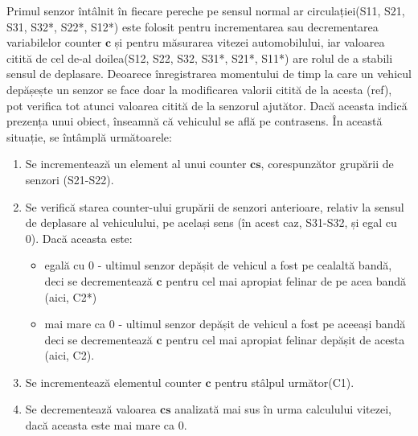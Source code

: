 Primul senzor întâlnit în fiecare pereche pe sensul normal ar circulației(S11, S21, S31, S32*, S22*, S12*) este folosit pentru incrementarea sau decrementarea variabilelor counter $\mathbf{c}$ și pentru măsurarea vitezei automobilului, iar valoarea citită de cel de-al doilea(S12, S22, S32, S31*, S21*, S11*) are rolul de a stabili sensul de deplasare. Deoarece înregistrarea momentului de timp la care un vehicul depășește un senzor se face doar la modificarea valorii citită de la acesta (ref), pot verifica tot atunci valoarea citită de la senzorul ajutător. Dacă  aceasta indică prezența unui obiect, înseamnă că vehiculul se află pe contrasens. În această situație, se întâmplă următoarele:

\begin{enumerate}
    \item Se incrementează un element al unui counter $\mathbf{cs}$, corespunzător grupării de senzori (S21-S22).
 \item Se verifică starea counter-ului grupării de senzori anterioare, relativ la sensul de deplasare al vehiculului, pe același sens (în acest caz, S31-S32, și egal cu 0). Dacă aceasta este:
 \begin{itemize}
     \item egală cu 0 - ultimul senzor depășit de vehicul a fost pe cealaltă bandă, deci se decrementează $\mathbf{c}$ pentru cel mai apropiat felinar de pe acea bandă (aici, C2*) 
     \item mai mare ca 0 - ultimul senzor depășit de vehicul a fost pe aceeași bandă deci se decrementează $\mathbf{c}$ pentru cel mai apropiat felinar depășit de acesta (aici, C2).   
 \end{itemize}
 \item Se incrementează elementul counter $\mathbf{c}$ pentru stâlpul următor(C1).
 \item Se decrementează valoarea $\mathbf{cs}$ analizată mai sus în urma calculului vitezei, dacă aceasta este mai mare ca 0.
\end{enumerate}

